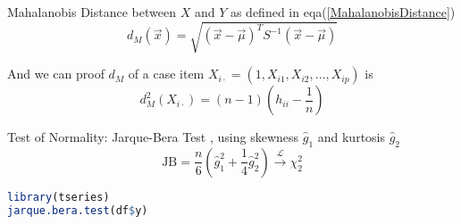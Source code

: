 \begin{itemize}[topsep=2pt,itemsep=2pt]
    Mahalanobis Distance between $ X $ and $ Y $ as defined in eqa(\ref{MahalanobisDistance})
    \begin{equation}
         d_M(\vec{x})=\sqrt{(\vec{x}-\vec{\mu})^TS ^{-1}(\vec{x}-\vec{\mu})} 
    \end{equation}

    And we can proof $ d_M $ of a case item $ X_{ i\cdot}=(1,X_{i1},X_{i2},\ldots,X_{ip}) $ is
    \begin{equation}
        d_{M}^2(X_{i\cdot})=(n-1)(h_{ii}-\dfrac{1}{n}) 
    \end{equation}
    
    
    
    


\end{itemize}

    






Test of Normality: Jarque-Bera Test , using skewness $ \hat{g}_1 $ and kurtosis $ \hat{g}_2 $
\begin{equation}
    \mathrm{JB}=\dfrac{n}{6}(\hat{g}_1^2+\dfrac{1}{4}\hat{g}_2^2) \xrightarrow[]{\mathscr{L}} \chi^2_2
\end{equation}

\begin{rcode}
\begin{lstlisting}[language=R]
library(tseries)
jarque.bera.test(df$y)
\end{lstlisting}

\end{rcode}











        

